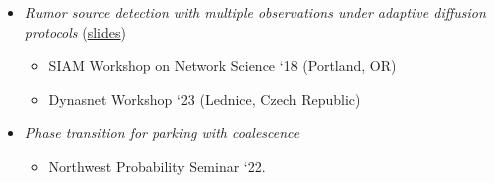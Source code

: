 \documentclass[letterpaper]{article}
\begin{document}
\begin{itemize}
 \item {\em{Rumor source detection with multiple observations under adaptive diffusion protocols}} (\href{https://jfrichey.github.io/pagedocs/lednice_rumor.pdf}{slides}) 
 
 \begin{itemize} 
 	\item SIAM Workshop on Network Science `18 (Portland, OR)
 	\item Dynasnet Workshop `23 (Lednice, Czech Republic)
 \end{itemize}
 
 \item {\em{Phase transition for parking with coalescence}} 
 \begin{itemize} \item Northwest Probability Seminar `22. \end{itemize}
\end{itemize}
\end{document}

